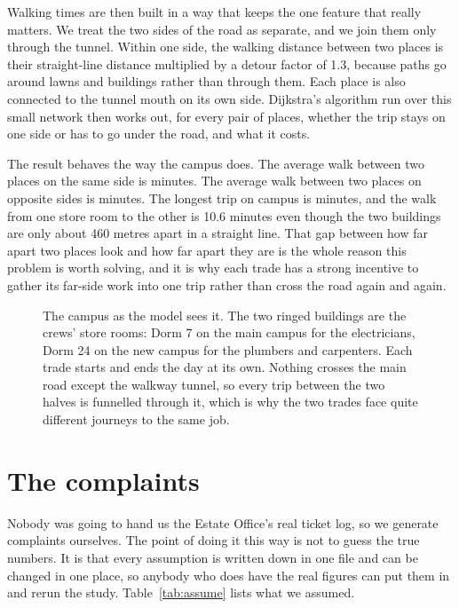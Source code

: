 \documentclass[11pt]{article}
\newcommand{\num}[1]{#1}
\newcommand{\figbox}[2]{%
  \begin{figure}[t]\centering
  \resizebox{\linewidth}{!}{}
  \caption{#2}\label{fig:#1}\end{figure}}
\begin{document}
Walking times are then built in a way that keeps the one feature that really
matters. We treat the two sides of the road as separate, and we join them only
through the tunnel. Within one side, the walking distance between two places
is their straight-line distance multiplied by a detour factor of
\num{1.3}, because paths go around lawns and buildings rather than through
them. Each place is also connected to the tunnel mouth on its own side.
Dijkstra's algorithm run over this small network then works out, for every
pair of places, whether the trip stays on one side or has to go under the
road, and what it costs.

The result behaves the way the campus does. The average walk between two
places on the same side is \NMeanSameCampus{} minutes. The average walk
between two places on opposite sides is \NMeanCrossCampus{} minutes. The
longest trip on campus is \NMaxWalk{} minutes, and the walk from one store
room to the other is \num{10.6} minutes even though the two buildings are
only about \num{460} metres apart in a straight line. That gap between how
far apart two places look and how far apart they are is the whole reason this
problem is worth solving, and it is why each trade has a strong incentive to
gather its far-side work into one trip rather than cross the road again and
again.

\figbox{campus}{The campus as the model sees it. The two ringed buildings are
the crews' store rooms: Dorm 7 on the main campus for the electricians, Dorm
24 on the new campus for the plumbers and carpenters. Each trade starts and
ends the day at its own. Nothing crosses the main road except the walkway
tunnel, so every trip between the two halves is funnelled through it, which
is why the two trades face quite different journeys to the same job.}

\section{The complaints}

Nobody was going to hand us the Estate Office's real ticket log, so we
generate complaints ourselves. The point of doing it this way is not to guess
the true numbers. It is that every assumption is written down in one file and
can be changed in one place, so anybody who does have the real figures can put
them in and rerun the study. Table~\ref{tab:assume} lists what we assumed.

\begin{table}[h]\centering\small

\caption{The assumptions behind the generated complaints. All of them live in
\texttt{src/instance.py} and all of them can be changed in one place.}
\label{tab:assume}
\end{table}
\end{document}
